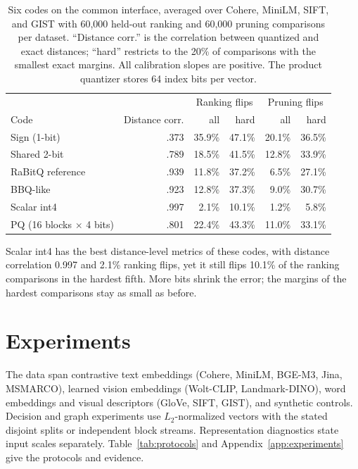 \documentclass[twoside,11pt]{article}
\begin{document}
\begin{table}[tbp]
\centering


\small
\begin{tabular}{lrrrrr}
\toprule
& & \multicolumn{2}{c}{Ranking flips} & \multicolumn{2}{c}{Pruning flips} \\
Code & Distance corr. & all & hard & all & hard \\
\midrule
Sign (1-bit) & .373 & 35.9\% & 47.1\% & 20.1\% & 36.5\% \\
Shared 2-bit & .789 & 18.5\% & 41.5\% & 12.8\% & 33.9\% \\
RaBitQ reference & .939 & 11.8\% & 37.2\% & 6.5\% & 27.1\% \\
BBQ-like & .923 & 12.8\% & 37.3\% & 9.0\% & 30.7\% \\
Scalar int4 & .997 & 2.1\% & 10.1\% & 1.2\% & 5.8\% \\
PQ (16 blocks $\times$ 4 bits) & .801 & 22.4\% & 43.3\% & 11.0\% & 33.1\% \\
\bottomrule
\end{tabular}

\small
\caption{Six codes on the common interface, averaged over Cohere, MiniLM, SIFT, and GIST with 60{,}000 held-out ranking and 60{,}000 pruning comparisons per dataset. ``Distance corr.'' is the correlation between quantized and exact distances; ``hard'' restricts to the 20\% of comparisons with the smallest exact margins. All calibration slopes are positive. The product quantizer stores 64 index bits per vector.}
\label{tab:cross-quantizer}
\end{table}

Scalar int4 has the best distance-level metrics of these codes, with distance correlation 0.997 and 2.1\% ranking flips, yet it still flips 10.1\% of the ranking comparisons in the hardest fifth. More bits shrink the error; the margins of the hardest comparisons stay as small as before.

\section{Experiments}
\label{sec:experiments}

The data span contrastive text embeddings (Cohere, MiniLM, BGE-M3, Jina, MSMARCO), learned vision embeddings (Wolt-CLIP, Landmark-DINO), word embeddings and visual descriptors (GloVe, SIFT, GIST), and synthetic controls. Decision and graph experiments use $L_2$-normalized vectors with the stated disjoint splits or independent block streams. Representation diagnostics state input scales separately. Table~\ref{tab:protocols} and Appendix~\ref{app:experiments} give the protocols and evidence.
\end{document}
